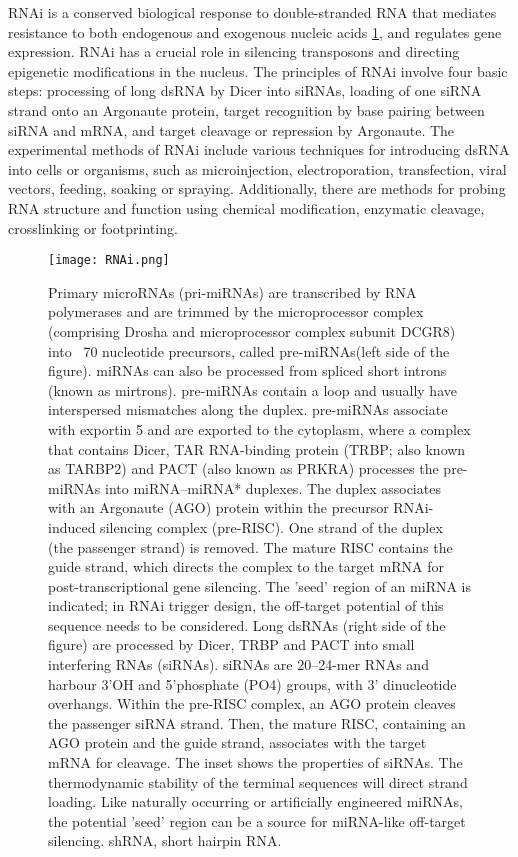 \documentclass[sn-standardnature]{sn-jnl}%
\theoremstyle{thmstyleone}%
\theoremstyle{thmstyletwo}%
\theoremstyle{thmstylethree}%
\begin{document}
RNAi is a conserved biological response to double-stranded RNA that mediates resistance to both endogenous and exogenous nucleic acids \ref{fig1}, and regulates gene expression. RNAi has a crucial role in silencing transposons and directing epigenetic modifications in the nucleus. The principles of RNAi involve four basic steps: processing of long dsRNA by Dicer into siRNAs, loading of one siRNA strand onto an Argonaute protein, target recognition by base pairing between siRNA and mRNA, and target cleavage or repression by Argonaute. The experimental methods of RNAi include various techniques for introducing dsRNA into cells or organisms, such as microinjection, electroporation, transfection, viral vectors, feeding, soaking or spraying. Additionally, there are methods for probing RNA structure and function using chemical modification, enzymatic cleavage, crosslinking or footprinting.

\begin{figure}[h]%
\centering
\texttt{[image: RNAi.png]}
\caption{Primary microRNAs (pri-miRNAs) are transcribed by RNA polymerases and are trimmed by the microprocessor complex (comprising Drosha and microprocessor complex subunit DCGR8) into ~70 nucleotide precursors, called pre-miRNAs(left side of the figure). miRNAs can also be processed from spliced short introns (known as mirtrons). pre-miRNAs contain a loop and usually have interspersed mismatches along the duplex. pre-miRNAs associate with exportin 5 and are exported to the cytoplasm, where a complex that contains Dicer, TAR RNA-binding protein (TRBP; also known as TARBP2) and PACT (also known as PRKRA) processes the pre-miRNAs into miRNA–miRNA* duplexes. The duplex associates with an Argonaute (AGO) protein within the precursor RNAi-induced silencing complex (pre-RISC). One strand of the duplex (the passenger strand) is removed. The mature RISC contains the guide strand, which directs the complex to the target mRNA for post-transcriptional gene silencing. The 'seed' region of an miRNA is indicated; in RNAi trigger design, the off-target potential of this sequence needs to be considered. Long dsRNAs (right side of the figure) are processed by Dicer, TRBP and PACT into small interfering RNAs (siRNAs). siRNAs are 20–24-mer RNAs and harbour 3'OH and 5'phosphate (PO4) groups, with 3' dinucleotide overhangs. Within the pre-RISC complex, an AGO protein cleaves the passenger siRNA strand. Then, the mature RISC, containing an AGO protein and the guide strand, associates with the target mRNA for cleavage. The inset shows the properties of siRNAs. The thermodynamic stability of the terminal sequences will direct strand loading. Like naturally occurring or artificially engineered miRNAs, the potential 'seed' region can be a source for miRNA-like off-target silencing. shRNA, short hairpin RNA\cite{davidson2011current}.}\label{fig1}
\end{figure}
\end{document}
